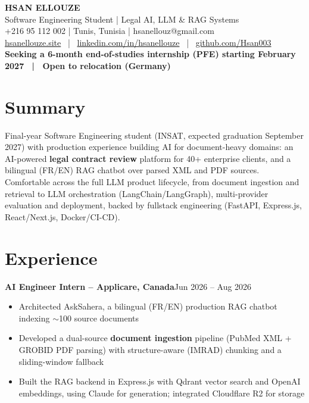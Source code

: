 \documentclass[10pt,a4paper]{article}
\newcommand{\entry}[2]{\vspace{1pt}\noindent\textbf{#1}\hfill{\color{muted}#2}\par}
\begin{document}
\begin{center}
  {\LARGE\bfseries HSAN ELLOUZE}\\[2pt]
  {\color{muted} Software Engineering Student | Legal AI, LLM \& RAG Systems}\\[2pt]
  {\footnotesize +216 95 112 002 | Tunis, Tunisia | hsanellouz@gmail.com}\\[1pt]
  {\footnotesize \href{https://hsanellouze.site}{hsanellouze.site} \ | \ \href{https://linkedin.com/in/hsanellouze}{linkedin.com/in/hsanellouze} \ | \ \href{https://github.com/Hsan003}{github.com/Hsan003}}\\[3pt]
  {\footnotesize\bfseries Seeking a 6-month end-of-studies internship (PFE) starting February 2027 \ | \ Open to relocation (Germany)}
\end{center}

\section{Summary}
Final-year Software Engineering student (INSAT, expected graduation September 2027) with production experience building AI for document-heavy domains: an AI-powered \textbf{legal contract review} platform for 40+ enterprise clients, and a bilingual (FR/EN) RAG chatbot over parsed XML and PDF sources. Comfortable across the full LLM product lifecycle, from document ingestion and retrieval to LLM orchestration (LangChain/LangGraph), multi-provider evaluation and deployment, backed by fullstack engineering (FastAPI, Express.js, React/Next.js, Docker/CI-CD).

\section{Experience}
\entry{AI Engineer Intern -- Applicare, Canada}{Jun 2026 -- Aug 2026}
\begin{itemize}
  \item Architected AskSahera, a bilingual (FR/EN) production RAG chatbot indexing $\sim$100 source documents
  \item Developed a dual-source \textbf{document ingestion} pipeline (PubMed XML + GROBID PDF parsing) with structure-aware (IMRAD) chunking and a sliding-window fallback
  \item Built the RAG backend in Express.js with Qdrant vector search and OpenAI embeddings, using Claude for generation; integrated Cloudflare R2 for storage
\end{itemize}
\end{document}
